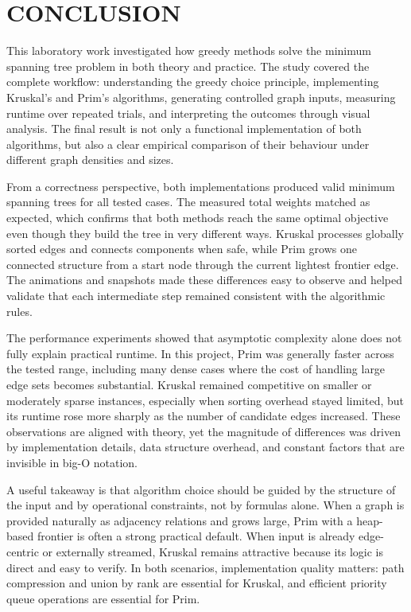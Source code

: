 ﻿\documentclass[12pt]{article}
\begin{document}
\newpage
{}
\section*{CONCLUSION}

This laboratory work investigated how greedy methods solve the minimum spanning tree problem in both theory and practice. The study covered the complete workflow: understanding the greedy choice principle, implementing Kruskal's and Prim's algorithms, generating controlled graph inputs, measuring runtime over repeated trials, and interpreting the outcomes through visual analysis. The final result is not only a functional implementation of both algorithms, but also a clear empirical comparison of their behaviour under different graph densities and sizes.

From a correctness perspective, both implementations produced valid minimum spanning trees for all tested cases. The measured total weights matched as expected, which confirms that both methods reach the same optimal objective even though they build the tree in very different ways. Kruskal processes globally sorted edges and connects components when safe, while Prim grows one connected structure from a start node through the current lightest frontier edge. The animations and snapshots made these differences easy to observe and helped validate that each intermediate step remained consistent with the algorithmic rules.

The performance experiments showed that asymptotic complexity alone does not fully explain practical runtime. In this project, Prim was generally faster across the tested range, including many dense cases where the cost of handling large edge sets becomes substantial. Kruskal remained competitive on smaller or moderately sparse instances, especially when sorting overhead stayed limited, but its runtime rose more sharply as the number of candidate edges increased. These observations are aligned with theory, yet the magnitude of differences was driven by implementation details, data structure overhead, and constant factors that are invisible in big-O notation.

A useful takeaway is that algorithm choice should be guided by the structure of the input and by operational constraints, not by formulas alone. When a graph is provided naturally as adjacency relations and grows large, Prim with a heap-based frontier is often a strong practical default. When input is already edge-centric or externally streamed, Kruskal remains attractive because its logic is direct and easy to verify. In both scenarios, implementation quality matters: path compression and union by rank are essential for Kruskal, and efficient priority queue operations are essential for Prim.
\end{document}
